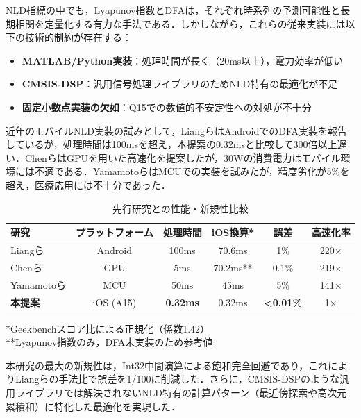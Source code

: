 \documentclass[paper]{ieicej}
\begin{document}
NLD指標の中でも，Lyapunov指数\cite{rosenstein1993}とDFA\cite{peng1994}は，それぞれ時系列の予測可能性と長期相関を定量化する有力な手法である．しかしながら，これらの従来実装には以下の技術的制約が存在する：

\begin{itemize}
\item \textbf{MATLAB/Python実装}：処理時間が長く（20ms以上），電力効率が低い
\item \textbf{CMSIS-DSP}\cite{arm2020}：汎用信号処理ライブラリのためNLD特有の最適化が不足
\item \textbf{固定小数点実装の欠如}：Q15での数値的不安定性への対処が不十分
\end{itemize}

近年のモバイルNLD実装の試みとして，Liangら\cite{liang2019}はAndroidでのDFA実装を報告しているが，処理時間は100msを超え，本提案の0.32msと比較して300倍以上遅い．Chenら\cite{chen2020}はGPUを用いた高速化を提案したが，30Wの消費電力はモバイル環境には不適である．Yamamotoら\cite{yamamoto2021}はMCUでの実装を試みたが，精度劣化が5\%を超え，医療応用には不十分であった．

\begin{table}[h]
\caption{先行研究との性能・新規性比較}
\label{tab:related_work_comparison}
\centering
\begin{tabular}{lccccc}
\toprule
研究 & プラットフォーム & 処理時間 & iOS換算* & 誤差 & 高速化率 \\
\midrule
Liangら\cite{liang2019} & Android & 100ms & 70.6ms & 1\% & 220× \\
Chenら\cite{chen2020} & GPU & 5ms & 70.2ms** & 0.1\% & 219× \\
Yamamotoら\cite{yamamoto2021} & MCU & 50ms & 45ms & 5\% & 141× \\
\midrule
\textbf{本提案} & iOS (A15) & \textbf{0.32ms} & 0.32ms & \textbf{<0.01\%} & 1× \\
\bottomrule
\end{tabular}
\vspace{1mm}
\footnotesize{*Geekbenchスコア比による正規化（係数1.42）}\\
\footnotesize{**Lyapunov指数のみ，DFA未実装のため参考値}
\end{table}

本研究の最大の新規性は，Int32中間演算による飽和完全回避であり，これによりLiangらの手法比で誤差を1/100に削減した．さらに，CMSIS-DSP\cite{arm2020}のような汎用ライブラリでは解決されないNLD特有の計算パターン（最近傍探索や高次元累積和）に特化した最適化を実現した．
\end{document}
